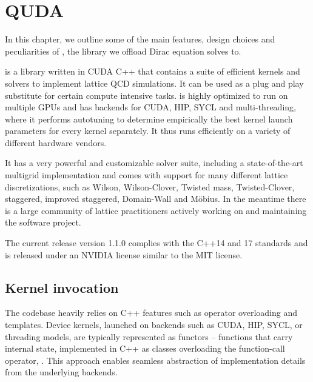 \chapter{QUDA}
\label{ch:p1:quda}




In this chapter, we outline some of the main features, design choices and peculiarities of \quda, the library we offload Dirac equation solves to.

\Quda \cite{QUDApaper} is a library written in CUDA C++ that contains a suite of efficient kernels and solvers to implement lattice QCD simulations. It can be used as a plug and play substitute for certain compute intensive tasks.
\Quda is highly optimized to run on multiple GPUs and has backends for CUDA, HIP, SYCL and multi-threading, where it performs autotuning to determine empirically the best kernel launch parameters for every kernel separately.
It thus runs efficiently on a variety of different hardware vendors.

It has a very powerful and customizable solver suite, including a state-of-the-art multigrid implementation and comes with support for many different lattice discretizations, such as Wilson, Wilson-Clover, Twisted mass, Twisted-Clover, staggered, improved staggered, Domain-Wall and Möbius. In the meantime there is a large community of lattice practitioners actively working on and maintaining the software project.

The current release version 1.1.0 complies with the C++14 and 17 standards and is released under an NVIDIA license similar to the MIT license.

\section{Kernel invocation}

The codebase heavily relies on C++ features such as operator overloading and templates. Device kernels, launched on backends such as CUDA, HIP, SYCL, or threading models, are typically represented as functors -- functions that carry internal state, implemented in C++ as classes overloading the function-call operator, . This approach enables seamless abstraction of implementation details from the underlying backends.

